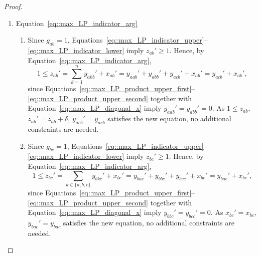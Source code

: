 \documentclass[11pt]{article}
\begin{document}
\begin{proof}
\begin{enumerate}[label=\Alph*.]
\begin{enumerate}[label=(\roman*)]
\[          \]
          Since $x_{ba}'=x_{ab}'$ by Equation~\eqref{eq::max_LP_symmetry_x} and $x_{bc}'=x_{bc}$, it follows that
          \begin{equation} \label{eq::y_bcb_bab}
            y_{bab}'+y_{bcb}'= x_{ab}'+x_{bc}' 
          \end{equation}
          is an additional constraint that is needed.
        \item Since $g_{cc}=0$, Equations~\eqref{eq::max_LP_indicator_upper}--\eqref{eq::max_LP_indicator_lower} imply $z_{cc}'=0$. Therefore, as in above
          \[
          0 = \sum_{k\in\{a,b,c\}}y_{ckc}' -\sum_{k\in\{a,b,c\}}x_{ck}' = y_{cac}' + y_{cbc}' - x_{ca}' - x_{cb}'.
          \]
          Since $x_{cb}'=x_{bc}$ and $x_{ca}' = x_{ca}$ by Equation~\eqref{eq::max_LP_symmetry_x}, it follows that 
          \begin{equation} \label{eq::y_cac_cbc}
            y_{cac}' + y_{cbc}'= x_{ac}'+x_{bc}' 
          \end{equation}
          is an additional constraint that is needed.
      \end{enumerate}
    \item Equation~\eqref{eq::max_LP_indicator_arg}
      \begin{enumerate}[label=(\roman*)]
        \item Since $g_{ab}=1$, Equations~\eqref{eq::max_LP_indicator_upper}--\eqref{eq::max_LP_indicator_lower} imply $z_{ab}' \geq 1$. Hence, by Equation~\eqref{eq::max_LP_indicator_arg},
          \[
          1 \leq z_{ab}' = \sum_{k = 1}^{n}y_{akb}' + x_{ab}' = y_{aab}'+y_{abb}'+y_{acb}'+x_{ab}'=y_{acb}'+x_{ab}',
          \]
          since Equations~\eqref{eq::max_LP_product_upper_first}--\eqref{eq::max_LP_product_upper_second} together with Equation~\eqref{eq::max_LP_diagonal_x} imply $y_{aab}'=y_{abb}'=0$.  As $1 \leq z_{ab}$, $z_{ab}' = z_{ab} + \delta$, $y_{acb}' = y_{acb}$ satisfies the new equation, no additional constraints are needed. 
        \item  Since $g_{bc}=1$, Equations~\eqref{eq::max_LP_indicator_upper}--\eqref{eq::max_LP_indicator_lower} imply $z_{bc}' \geq 1$. Hence, by Equation~\eqref{eq::max_LP_indicator_arg},
          \[
          1 \leq z_{bc}' = \sum_{k\in\{a,b,c\}}y_{bkc}'+x_{bc}' =y_{bac}'+y_{bbc}'+y_{bcc}'+x_{bc}'=y_{bac}'+x_{bc}',
          \]
          since Equations~\eqref{eq::max_LP_product_upper_first}--\eqref{eq::max_LP_product_upper_second} together with Equation~\eqref{eq::max_LP_diagonal_x} imply $y_{bbc}'=y_{bcc}'=0$. As $x_{bc}'=x_{bc}$, $y_{bac}' = y_{bac}$ satisfies the new equation, no additional constraints are needed. 

\end{enumerate}
\end{enumerate}
\end{proof}
\end{document}
